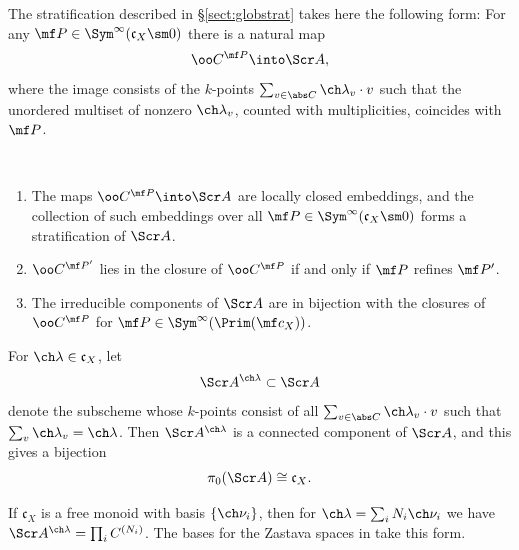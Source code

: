 \subsubsection{}
The stratification described in \S \ref{sect:globstrat} takes here the following form:
For any $\mf P \in \Sym^\infty(\mathfrak c_X\sm 0)$ there is a natural map
\[ \oo C^{\mf P} \into \Scr A, \]
where the image consists of the $k$-points $\sum_{v\in \abs C} \ch\lambda_v\cdot v$ such that the unordered multiset of nonzero $\ch\lambda_v$, counted
with multiplicities, coincides with $\mf P$.



\begin{prop}
\notready
\label{prop:Astrata}
\
\begin{enumerate}
\item The maps $\oo C^{\mf P}\into \Scr A$ are locally closed embeddings,
and the collection of such embeddings over all $\mf P\in \Sym^\infty(\mathfrak c_X \sm 0)$ forms a stratification of $\Scr A$.
\item $\oo C^{\mf P'}$ lies in the closure of $\oo C^{\mf P}$
if and only if $\mf P$ refines $\mf P'$.
\item The irreducible components of $\Scr A$ are in bijection with
the closures of $\oo C^{\mf P}$ for $\mf P \in \Sym^\infty(\Prim(\mf c_X))$.
\end{enumerate}
\end{prop}

\begin{cor}
\notready
For $\ch\lambda \in \mathfrak c_X$, let
\[ \Scr A^{\ch\lambda} \subset \Scr A \]
denote the subscheme whose $k$-points consist of all
$\sum_{v\in \abs C} \ch\lambda_v \cdot v$
such that $\sum_v \ch\lambda_v = \ch\lambda$.
Then $\Scr A^{\ch\lambda}$ is a connected component of $\Scr A$, and
this gives a bijection
\[ \pi_0(\Scr A) \cong \mathfrak c_X. \]
\end{cor}

\begin{rem}
\notready\label{rem:Afree}
If $\mathfrak c_X$ is a free monoid with basis $\{ \ch\nu_i \}$,
then for $\ch\lambda = \sum_i N_i \ch\nu_i$ we have
$\Scr A^{\ch\lambda} = \prod_i C^{(N_i)}$. The bases for the Zastava spaces
in \cite[\S 2.1]{BFGM} take this form.
\end{rem}



